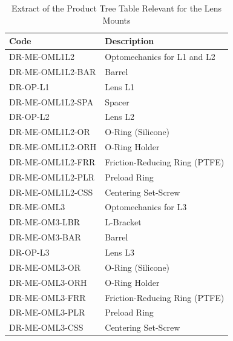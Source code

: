 \documentclass{article}
\begin{document}
\begin{table}
\caption{Extract of the Product Tree Table Relevant for the Lens Mounts}
\label{table:lens-barrel-product-tree}
\begin{center}
\small
\begin{tabular}{ll}
\hline
\hline
Code                &Description\\
\hline
DR-ME-OML1L2        &Optomechanics for L1 and L2\\
DR-ME-OML1L2-BAR    &Barrel\\
DR-OP-L1            &Lens L1\\
DR-ME-OML1L2-SPA		&Spacer\\
DR-OP-L2            &Lens L2\\
DR-ME-OML1L2-OR		  &O-Ring (Silicone)\\
DR-ME-OML1L2-ORH		&O-Ring Holder\\
DR-ME-OML1L2-FRR		&Friction-Reducing Ring (PTFE)\\
DR-ME-OML1L2-PLR		&Preload Ring\\
DR-ME-OML1L2-CSS		&Centering Set-Screw\\
\hline
DR-ME-OML3          &Optomechanics for L3\\
DR-ME-OM3-LBR       &L-Bracket\\
DR-ME-OM3-BAR       &Barrel\\
DR-OP-L3            &Lens L3\\
DR-ME-OML3-OR		    &O-Ring (Silicone)\\
DR-ME-OML3-ORH	  	&O-Ring Holder\\
DR-ME-OML3-FRR	  	&Friction-Reducing Ring (PTFE)\\
DR-ME-OML3-PLR	  	&Preload Ring\\
DR-ME-OML3-CSS	  	&Centering Set-Screw\\
\hline
\end{tabular}
\end{center}
\end{table}
\end{document}
